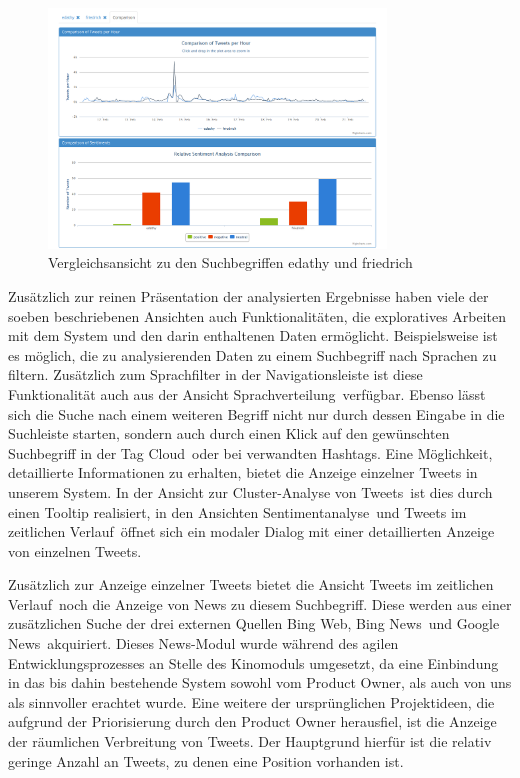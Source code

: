 \begin{figure}[h!]
\centering
\includegraphics[width=0.8\textwidth]{Bilder/Frontend/Screenshots/comparison.png}
\caption{Vergleichsansicht zu den Suchbegriffen \glqq edathy\grqq{} und \glqq friedrich\grqq}
\label{fig:compare}
\end{figure}

Zusätzlich zur reinen Präsentation der analysierten Ergebnisse haben viele der soeben beschriebenen Ansichten auch Funktionalitäten, die exploratives Arbeiten mit dem System und den darin enthaltenen Daten ermöglicht. Beispielsweise ist es möglich, die zu analysierenden Daten zu einem Suchbegriff nach Sprachen zu filtern. Zusätzlich zum Sprachfilter in der Navigationsleiste ist diese Funktionalität auch aus der Ansicht \glqq Sprachverteilung\grqq\ verfügbar. Ebenso lässt sich die Suche nach einem weiteren Begriff nicht nur durch dessen Eingabe in die Suchleiste starten, sondern auch durch einen Klick auf den gewünschten Suchbegriff in der \glqq Tag Cloud\grqq\ oder bei \glqq verwandten Hashtags\grqq{}.
Eine Möglichkeit, detaillierte Informationen zu erhalten, bietet die Anzeige einzelner Tweets in unserem System. In der Ansicht zur \glqq Cluster-Analyse von Tweets\grqq\ ist dies durch einen Tooltip realisiert, in den Ansichten \glqq Sentimentanalyse\grqq\ und \glqq Tweets im zeitlichen Verlauf\grqq\ öffnet sich ein modaler Dialog mit einer detaillierten Anzeige von einzelnen Tweets.

Zusätzlich zur Anzeige einzelner Tweets bietet die Ansicht \glqq Tweets im zeitlichen Verlauf\grqq\ noch die Anzeige von News zu diesem Suchbegriff. Diese werden aus einer zusätzlichen Suche der drei externen Quellen \glqq Bing Web\grqq, \glqq Bing News\grqq\ und \glqq Google News\grqq\ akquiriert.
Dieses News-Modul wurde während des agilen Entwicklungsprozesses an Stelle des Kinomoduls umgesetzt, da eine Einbindung in das bis dahin bestehende System sowohl vom Product Owner, als auch von uns als sinnvoller erachtet wurde.
Eine weitere der ursprünglichen Projektideen, die aufgrund der Priorisierung durch den Product Owner herausfiel, ist die Anzeige der räumlichen Verbreitung von Tweets. Der Hauptgrund hierfür ist die relativ geringe Anzahl an Tweets, zu denen eine Position vorhanden ist.

